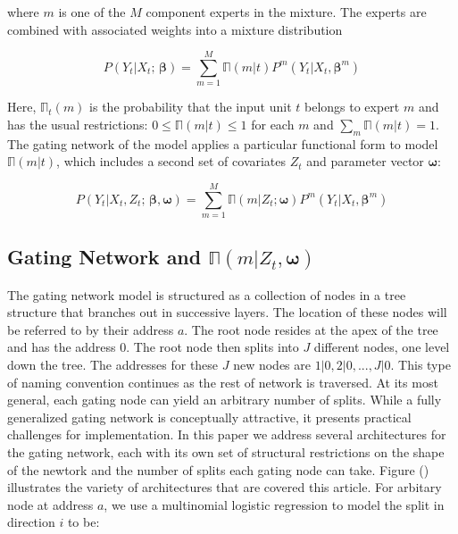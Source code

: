 \documentclass[12pt]{article}
\newcommand{\expmixwt}[0]{\mathbb{\Pi}}
\begin{document}
where $m$ is one of the $M$ component experts in the mixture. The experts
are combined with associated weights into a mixture distribution

\begin{equation} \label{eq:staticmixture}
  P(Y_{t} | X_{t}; \, \boldsymbol{\beta}) = \sum_{m=1}^{M} \expmixwt(m|t) P^{m}(Y_{t} | X_{t}, \boldsymbol{\beta}^{m})
\end{equation}

Here, $\expmixwt_{t}(m)$ is the probability that the input unit $t$ belongs
to expert $m$ and has the usual restrictions: $0 \leq \expmixwt(m|t) \leq 1$
for each $m$ and $\sum_{m} \expmixwt(m|t) = 1$. The gating network of the model
applies a particular functional form to model $\expmixwt(m|t)$, which includes a
second set of covariates $Z_{t}$ and parameter vector $\boldsymbol{\omega}$:

\begin{equation} \label{eq:mixture}
  P(Y_{t} | X_{t}, Z_{t}; \, \boldsymbol{\beta}, \boldsymbol{\omega}) = \sum_{m=1}^{M} \expmixwt(m | Z_{t}; \boldsymbol{\omega}) P^{m}(Y_{t} | X_{t}, \boldsymbol{\beta}^{m})
\end{equation}


\subsection{Gating Network and $\expmixwt(m | Z_{t}, \boldsymbol{\omega})$}

The gating network model is structured as a collection of nodes in a tree
structure that branches out in successive layers. The location of these nodes will
be referred to by their address $a$. The root node resides at the apex of the tree
and has the address $0$. The root node then splits into $J$ different nodes,
one level down the tree. The addresses for these $J$ new nodes are 
$1|0, 2|0, ..., J|0$. This type of naming convention continues as the
rest of network is traversed. At its most general, each gating node can yield an
arbitrary number of splits. While a fully generalized gating network is
conceptually attractive, it presents practical challenges for implementation.
In this paper we address several architectures for the gating network, each
with its own set of structural restrictions on the shape of the newtork and
the number of splits each gating node can take. Figure () illustrates the 
variety of architectures that are covered this article. For arbitary
node at address $a$, we use a multinomial logistic regression to model the
split in direction $i$ to be:
\end{document}
